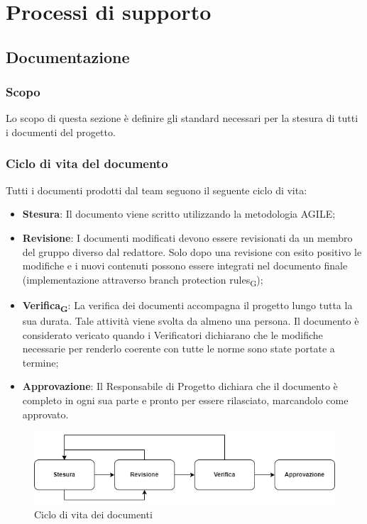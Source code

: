 \section{Processi di supporto}

\subsection{Documentazione}

\subsubsection{Scopo}
Lo scopo di questa sezione è definire gli standard necessari per la stesura di tutti i documenti del progetto.

\subsubsection{Ciclo di vita del documento}
Tutti i documenti prodotti dal team seguono il seguente ciclo di vita:
\begin{itemize}
    \item \textbf{Stesura}: Il documento viene scritto utilizzando la metodologia AGILE;
    \item \textbf{Revisione}: I documenti modificati devono essere revisionati da un membro del gruppo diverso dal redattore. Solo dopo una revisione con esito positivo le modifiche e i nuovi contenuti possono essere integrati nel documento finale (implementazione attraverso branch protection rules\textsubscript{G});
    \item \textbf{Verifica\textsubscript{G}}: La verifica dei documenti accompagna il progetto lungo tutta la sua durata. Tale attività viene svolta da almeno una persona. Il documento è considerato 
	vericato quando i Verificatori dichiarano che le modifiche necessarie per renderlo coerente con tutte le norme sono state portate a termine; 
    \item \textbf{Approvazione}: Il Responsabile di Progetto dichiara che il documento è completo in ogni sua parte e pronto per essere rilasciato, marcandolo come approvato.
\end{itemize}
\begin{figure}[H]
    \centering
    \includegraphics[scale=0.8]{img/ciclo_di_vita.png}
    \caption{Ciclo di vita dei documenti}
\end{figure}
\newpage
